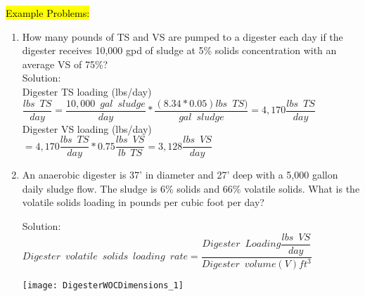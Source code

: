                 \hl{Example Problems:}\\

                \begin{enumerate}
                    \item How many pounds of TS and VS are pumped to a digester each day if the digester receives 10,000 gpd of sludge at 5\% solids concentration with an average VS of 75\%?\\
                    Solution:\\

                    Digester TS loading (lbs/day)\\
                    \vspace{0.3cm}
                        $
                            \dfrac{lbs \enspace TS}{day}
                            =
                            \dfrac{10,000 \enspace gal \enspace sludge}{day}
                            *
                            \dfrac{(8.34*0.05) lbs \enspace TS )}{gal \enspace sludge}
                            =4,170
                            \dfrac{lbs \enspace TS}{day}
                        $
                        \\
                        \vspace{0.3cm}
                        Digester VS loading (lbs/day)\\
                        \vspace{0.3cm}
                        $=4,170     \dfrac{lbs \enspace TS}{day}*0.75\dfrac{lbs \enspace VS}{lb \enspace TS}=\boxed{3,128 \dfrac{lbs \enspace VS}{day}}$
                        \vspace{0.5cm}
                        \item An anaerobic digester is 37’ in diameter and 27’ deep with a 5,000 gallon daily sludge flow. The sludge is 6\% solids and 66\% volatile solids.  What is the volatile solids loading in pounds per cubic foot per day?
                            
                            
                        Solution:\\
                        {
                        $
                            Digester \enspace volatile \enspace solids          \enspace loading \enspace rate =                    \dfrac
                            {
                            Digester \enspace Loading 
                                \dfrac
                                {
                                lbs \enspace VS
                                }
                                {
                                day
                                }
                            }
                            {
                            Digester \enspace volume (V)ft^3
                            }
                        $
                        }\\
                        \begin{center}
                        \texttt{[image: DigesterWOCDimensions\_1]}
                        \end{center}


\end{enumerate}
